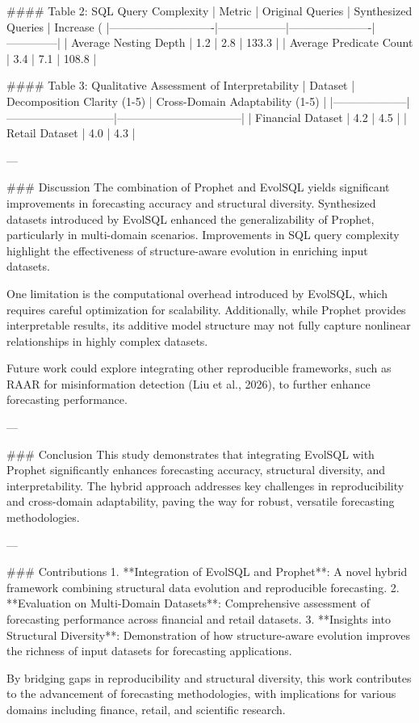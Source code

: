 #### Table 2: SQL Query Complexity
| Metric                     | Original Queries | Synthesized Queries | Increase (%
|----------------------------|------------------|----------------------|--------------|
| Average Nesting Depth      | 1.2              | 2.8                  | 133.3        |
| Average Predicate Count    | 3.4              | 7.1                  | 108.8        |

#### Table 3: Qualitative Assessment of Interpretability
| Dataset            | Decomposition Clarity (1-5) | Cross-Domain Adaptability (1-5) |
|--------------------|-----------------------------|---------------------------------|
| Financial Dataset  | 4.2                         | 4.5                             |
| Retail Dataset     | 4.0                         | 4.3                             |

---

### Discussion
The combination of Prophet and EvolSQL yields significant improvements in forecasting accuracy and structural diversity. Synthesized datasets introduced by EvolSQL enhanced the generalizability of Prophet, particularly in multi-domain scenarios. Improvements in SQL query complexity highlight the effectiveness of structure-aware evolution in enriching input datasets.

One limitation is the computational overhead introduced by EvolSQL, which requires careful optimization for scalability. Additionally, while Prophet provides interpretable results, its additive model structure may not fully capture nonlinear relationships in highly complex datasets.

Future work could explore integrating other reproducible frameworks, such as RAAR for misinformation detection (Liu et al., 2026), to further enhance forecasting performance.

---

### Conclusion
This study demonstrates that integrating EvolSQL with Prophet significantly enhances forecasting accuracy, structural diversity, and interpretability. The hybrid approach addresses key challenges in reproducibility and cross-domain adaptability, paving the way for robust, versatile forecasting methodologies.

---

### Contributions
1. **Integration of EvolSQL and Prophet**: A novel hybrid framework combining structural data evolution and reproducible forecasting.
2. **Evaluation on Multi-Domain Datasets**: Comprehensive assessment of forecasting performance across financial and retail datasets.
3. **Insights into Structural Diversity**: Demonstration of how structure-aware evolution improves the richness of input datasets for forecasting applications.

By bridging gaps in reproducibility and structural diversity, this work contributes to the advancement of forecasting methodologies, with implications for various domains including finance, retail, and scientific research.